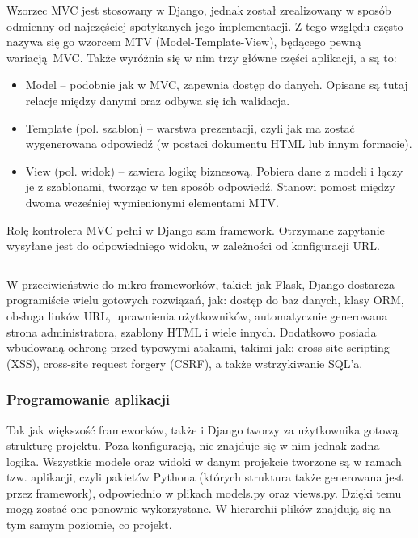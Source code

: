 Wzorzec MVC jest stosowany w Django, jednak został zrealizowany w sposób odmienny od najczęściej spotykanych jego implementacji. Z tego względu często nazywa się go wzorcem MTV (Model-Template-View), będącego pewną wariacją MVC. Także wyróżnia się w nim trzy główne części aplikacji, a są to:
\begin{itemize}
	\item Model -- podobnie jak w MVC, zapewnia dostęp do danych. Opisane są tutaj relacje między danymi oraz odbywa się ich walidacja.
	\item Template (pol. szablon) -- warstwa prezentacji, czyli jak ma zostać wygenerowana odpowiedź (w postaci dokumentu HTML lub innym formacie).
	\item View (pol. widok) -- zawiera logikę biznesową. Pobiera dane z modeli i łączy je z szablonami, tworząc w ten sposób odpowiedź. Stanowi pomost między dwoma wcześniej wymienionymi elementami MTV.
\end{itemize}
Rolę kontrolera MVC pełni w Django sam framework. Otrzymane zapytanie wysyłane jest do odpowiedniego widoku, w zależności od konfiguracji URL.

\begin{singlespace}
	\vspace{0.3cm}
	\inputminted[fontsize=\footnotesize]{python}{src/urls.py}
	\label{l:url}
\end{singlespace}

W przeciwieństwie do mikro frameworków, takich jak Flask, Django dostarcza programiście wielu gotowych rozwiązań, jak: dostęp do baz danych, klasy ORM, obsługa linków URL, uprawnienia użytkowników, automatycznie generowana strona administratora, szablony HTML i wiele innych. Dodatkowo posiada wbudowaną ochronę przed typowymi atakami, takimi jak: cross-site scripting (XSS), cross-site request forgery (CSRF), a także wstrzykiwanie SQL'a.

\subsubsection*{Programowanie aplikacji}
Tak jak większość frameworków, także i Django tworzy za użytkownika gotową strukturę projektu. Poza konfiguracją, nie znajduje się w nim jednak żadna logika. Wszystkie modele oraz widoki w danym projekcie tworzone są w ramach tzw. aplikacji, czyli pakietów Pythona (których struktura także generowana jest przez framework), odpowiednio w plikach models.py oraz views.py. Dzięki temu mogą zostać one ponownie wykorzystane. W hierarchii plików znajdują się na tym samym poziomie, co projekt. 

